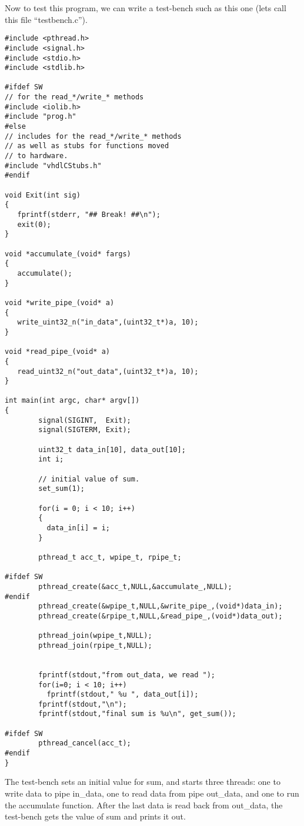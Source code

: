 \documentclass{article}
\begin{document}
Now to test this program, we can write a test-bench
such as this one (lets call this file ``testbench.c'').
\begin{verbatim}
#include <pthread.h>
#include <signal.h>
#include <stdio.h>
#include <stdlib.h>

#ifdef SW 
// for the read_*/write_* methods
#include <iolib.h>
#include "prog.h"
#else
// includes for the read_*/write_* methods
// as well as stubs for functions moved
// to hardware.
#include "vhdlCStubs.h"
#endif

void Exit(int sig)
{
   fprintf(stderr, "## Break! ##\n");
   exit(0);
}

void *accumulate_(void* fargs)
{
   accumulate();
}

void *write_pipe_(void* a)
{
   write_uint32_n("in_data",(uint32_t*)a, 10);
}

void *read_pipe_(void* a)
{
   read_uint32_n("out_data",(uint32_t*)a, 10);
}

int main(int argc, char* argv[])
{
        signal(SIGINT,  Exit);
        signal(SIGTERM, Exit);

        uint32_t data_in[10], data_out[10];
        int i;
	
        // initial value of sum.
        set_sum(1); 

        for(i = 0; i < 10; i++)
        {
          data_in[i] = i;
        }

        pthread_t acc_t, wpipe_t, rpipe_t;

#ifdef SW
        pthread_create(&acc_t,NULL,&accumulate_,NULL);
#endif
        pthread_create(&wpipe_t,NULL,&write_pipe_,(void*)data_in);
        pthread_create(&rpipe_t,NULL,&read_pipe_,(void*)data_out);

        pthread_join(wpipe_t,NULL);
        pthread_join(rpipe_t,NULL);


        fprintf(stdout,"from out_data, we read ");
        for(i=0; i < 10; i++)
          fprintf(stdout," %u ", data_out[i]);
        fprintf(stdout,"\n");
        fprintf(stdout,"final sum is %u\n", get_sum());

#ifdef SW
        pthread_cancel(acc_t);
#endif
}

\end{verbatim}
The test-bench sets an initial value for sum, and starts
three threads: one to write data to pipe in\_data, one
to read data from pipe out\_data, and one to run the
accumulate function.  After the last data is read back
from out\_data, the test-bench gets the value of sum
and prints it out. 
\end{document}
